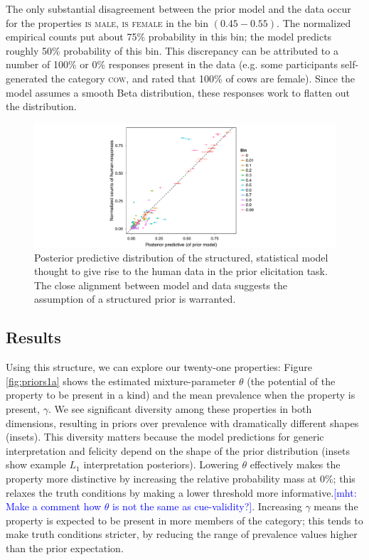 \documentclass[12pt,letterpaper]{article}
\newcommand{\mht}[1]{\textcolor{Blue}{[mht: #1]}}
\begin{document}
The only substantial disagreement between the prior model and the data occur for  the properties \textsc{is male, is female} in the bin $(0.45-0.55)$. 
The normalized empirical counts put about 75\% probability in this bin; the model predicts roughly 50\% probability of this bin. 
This discrepancy can be attributed to a number of 100\% or 0\% responses present in the data (e.g. some participants self-generated the category \textsc{cow}, and rated that 100\% of cows are female). 
Since the model assumes a smooth Beta distribution, these responses work to flatten out the distribution.

\begin{figure}
\centering
    \includegraphics[width=0.6\columnwidth]{postPred-priorModel.pdf}
    \caption{Posterior predictive distribution of the structured, statistical model thought to give rise to the human data in the prior elicitation task. The close alignment between model and data suggests the assumption of a structured prior is warranted.}
  \label{fig:pp-priorModel}
\end{figure}

\subsection*{Results}

Using this structure, we can explore our twenty-one properties:
Figure \ref{fig:priors1a} shows the estimated mixture-parameter $\theta$ (the potential of the property to be present in a kind) and the mean prevalence when the property is present, $\gamma$. 
We see significant diversity among these properties in both dimensions, resulting in priors over prevalence with dramatically different shapes (insets). 
This diversity matters because the model predictions for generic interpretation and felicity depend on the shape of the prior distribution (insets show example $L_1$ interpretation posteriors).
Lowering $\theta$ effectively makes the property more distinctive by increasing the relative probability mass at 0\%; this relaxes the truth conditions by making a lower threshold more informative.\mht{Make a comment how $\theta$ is not the same as cue-validity?}.
Increasing $\gamma$ means the property is expected to be present in more members of the category; this tends to make truth conditions stricter, by reducing the range of prevalence values higher than the prior expectation. 
\end{document}
